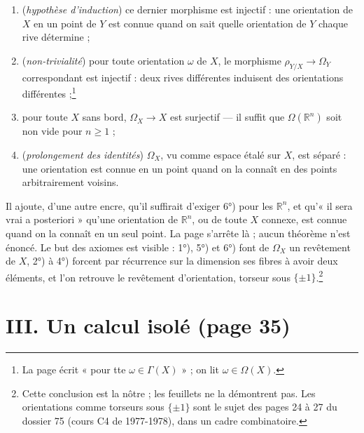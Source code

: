 \documentclass[11pt,a4paper]{article}
\begin{document}
\begin{enumerate}
  \item[3°)] (\emph{hypothèse d'induction}) ce dernier morphisme est
  injectif : une orientation de $X$ en un point de $Y$ est connue quand on
  sait quelle orientation de $Y$ chaque rive détermine ;
  \item[4°)] (\emph{non-trivialité}) pour toute orientation $\omega$ de $X$,
  le morphisme $\rho_{Y/X} \to \Omega_Y$ correspondant est injectif : deux
  rives différentes induisent des orientations différentes ;\footnote{La page
  écrit « pour tte $\omega \in \Gamma(X)$ » ; on lit $\omega \in \Omega(X)$.}
  \item[5°)] pour toute $X$ sans bord, $\Omega_X \to X$ est surjectif — il
  suffit que $\Omega(\mathbb{R}^n)$ soit non vide pour $n \geq 1$ ;
  \item[6°)] (\emph{prolongement des identités}) $\Omega_X$, vu comme espace
  étalé sur $X$, est séparé : une orientation est connue en un point quand
  on la connaît en des points arbitrairement voisins.
\end{enumerate}
Il ajoute, d'une autre encre, qu'il suffirait d'exiger 6°) pour les
$\mathbb{R}^n$, et qu'« il sera vrai a posteriori » qu'une orientation de
$\mathbb{R}^n$, ou de toute $X$ connexe, est connue quand on la connaît en un
seul point. La page s'arrête là ; aucun théorème n'est énoncé. Le but des
axiomes est visible : 1°), 5°) et 6°) font de $\Omega_X$ un revêtement
de $X$, 2°) à 4°) forcent par récurrence sur la dimension ses fibres à avoir
deux éléments, et l'on retrouve le revêtement d'orientation, torseur sous
$\{\pm 1\}$.\footnote{Cette conclusion est la nôtre ; les feuillets ne la
démontrent pas. Les orientations comme torseurs sous $\{\pm1\}$ sont le sujet
des pages 24 à 27 du dossier 75 (cours C4 de 1977-1978), dans un cadre
combinatoire.}

\section*{III. Un calcul isolé (page 35)}
\end{document}
